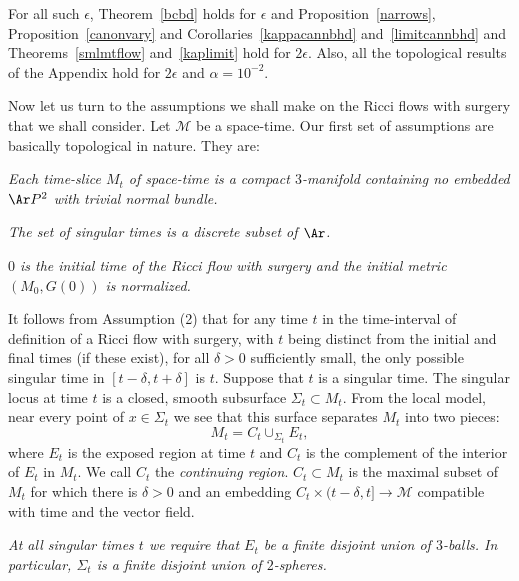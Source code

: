 For all such $\epsilon$, Theorem~\ref{bcbd} holds for $\epsilon$ and
Proposition~\ref{narrows}, Proposition~\ref{canonvary} and
Corollaries~\ref{kappacannbhd} and~\ref{limitcannbhd} and Theorems~\ref{smlmtflow} and~\ref{kaplimit}
 hold for $2\epsilon$. Also, all the topological results of the Appendix hold
for $2\epsilon$ and $\alpha=10^{-2}$.


Now let us turn to the assumptions we shall make on the Ricci flows
with surgery that we shall consider. Let ${\mathcal M}$ be a
space-time. Our first  set of assumptions are basically topological
in nature. They are:

\bigskip

 {\em Each
time-slice $M_t$ of space-time is a compact $3$-manifold
containing no embedded $\Ar P^2$ with trivial normal bundle.}


\bigskip


 {\em The set of
singular times is a discrete subset of  $\Ar$.}


\bigskip



 {\em
$0$ is the initial time of the Ricci flow with surgery and the
initial metric $(M_0,G(0))$ is normalized.}

\bigskip


 It follows
from Assumption (2) that for any time $t$ in the time-interval of
definition of a Ricci flow with surgery, with $t$ being distinct
from the initial and final times (if these exist), for all
$\delta>0$ sufficiently small, the only possible singular time in
$[t-\delta,t+\delta]$ is $t$. Suppose that $t$ is a singular time.
The singular locus at time $t$ is a closed, smooth subsurface
$\Sigma_{t}\subset M_{t}$. From the local
model, near every point of $x\in \Sigma_{t}$ we see that this
surface separates $M_{t}$ into two pieces:
$$M_{t}=C_{t}\cup_{\Sigma_{t}}E_{t},$$
where $E_{t}$ is the exposed region at time $t$ and $C_{t}$ is the
complement of the interior of $E_{t}$ in $M_{t}$. We call $C_t$ the
{\em continuing region}.  $C_t\subset M_t$ is the maximal subset of
$M_t$ for which there is $\delta>0$ and an embedding $C_t\times
(t-\delta,t]\to {\mathcal M}$ compatible with time and the vector
field.

 {\em
At all singular times $t$  we require that $E_{t}$ be a finite
disjoint union of $3$-balls. In particular, $\Sigma_{t}$ is a
finite disjoint union of $2$-spheres.}

